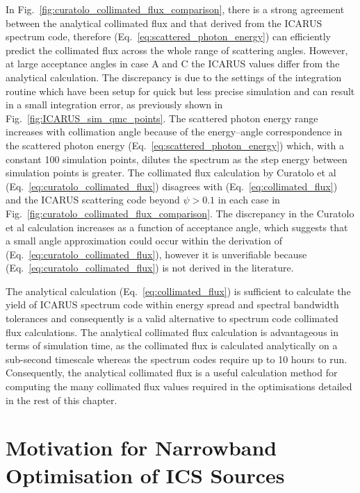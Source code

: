 \documentclass[../main.tex]{subfiles}
\begin{document}
In Fig.~\ref{fig:curatolo_collimated_flux_comparison}, there is a strong agreement between the analytical collimated flux and that derived from the \textsc{ICARUS} spectrum code, therefore (Eq.~\ref{eq:scattered_photon_energy}) can efficiently predict the collimated flux across the whole range of scattering angles. However, at large acceptance angles in case A and C the \textsc{ICARUS} values differ from the analytical calculation. The discrepancy is due to the settings of the integration routine which have been setup for quick but less precise simulation and can result in a small integration error, as previously shown in Fig.~\ref{fig:ICARUS_sim_qmc_points}. The scattered photon energy range increases with collimation angle because of the energy--angle correspondence  in the scattered photon energy (Eq.~\ref{eq:scattered_photon_energy}) which, with a constant 100 simulation points, dilutes the spectrum as the step energy between simulation points is greater. The collimated flux calculation by Curatolo et al \cite{curatolo2017analytical} (Eq.~\ref{eq:curatolo_collimated_flux}) disagrees with (Eq.~\ref{eq:collimated_flux}) and the \textsc{ICARUS} scattering code beyond $\psi>0.1$ in each case in Fig.~\ref{fig:curatolo_collimated_flux_comparison}. The discrepancy in the Curatolo et al calculation increases as a function of acceptance angle, which suggests that a small angle approximation could occur within the derivation of (Eq.~\ref{eq:curatolo_collimated_flux}), however it is unverifiable because (Eq.~\ref{eq:curatolo_collimated_flux}) is not derived in the literature.  

The analytical calculation (Eq.~\ref{eq:collimated_flux}) is sufficient to calculate the yield of \textsc{ICARUS} spectrum code within energy spread and spectral bandwidth tolerances and consequently is a valid alternative to spectrum code collimated flux calculations. The analytical collimated flux calculation is advantageous in terms of simulation time, as the collimated flux is calculated analytically on a sub-second timescale whereas the spectrum codes require up to 10 hours to run. Consequently, the analytical collimated flux is a useful calculation method for computing the many collimated flux values required in the optimisations detailed in the rest of this chapter.   

\section{Motivation for Narrowband Optimisation of ICS Sources}
\label{sec:motivation_optimisation}
\end{document}
